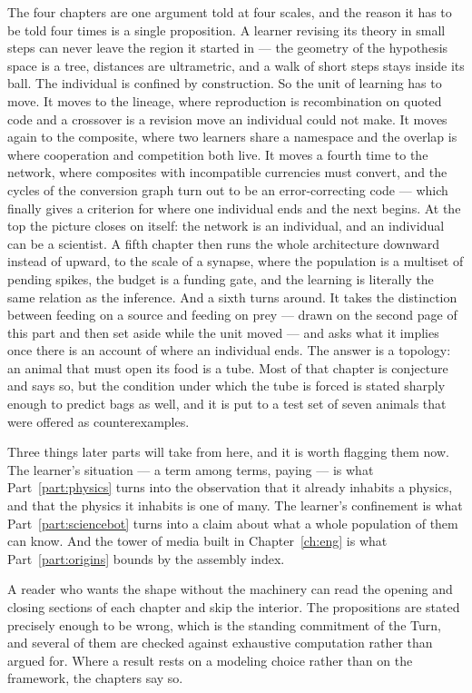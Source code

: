 \documentclass[12pt,openright,twoside]{book}
\theoremstyle{remark}
\theoremstyle{plain}
\theoremstyle{remark}
\theoremstyle{plain}
\theoremstyle{plain}
\begin{document}
The four chapters are one argument told at four scales, and the reason it
has to be told four times is a single proposition.
A learner revising its theory in small steps can never leave the region it
started in --- the geometry of the hypothesis space is a tree, distances are
ultrametric, and a walk of short steps stays inside its ball.
The individual is confined by construction.
So the unit of learning has to move.
It moves to the lineage, where reproduction is recombination on quoted code
and a crossover is a revision move an individual could not make.
It moves again to the composite, where two learners share a namespace and
the overlap is where cooperation and competition both live.
It moves a fourth time to the network, where composites with incompatible
currencies must convert, and the cycles of the conversion graph turn out to
be an error-correcting code --- which finally gives a criterion for where one
individual ends and the next begins.
At the top the picture closes on itself: the network is an individual, and
an individual can be a scientist.
A fifth chapter then runs the whole architecture downward instead of
upward, to the scale of a synapse, where the population is a multiset of
pending spikes, the budget is a funding gate, and the learning is
literally the same relation as the inference.
And a sixth turns around. It takes the distinction between feeding on a
source and feeding on prey --- drawn on the second page of this part and
then set aside while the unit moved --- and asks what it implies once
there is an account of where an individual ends. The answer is a
topology: an animal that must open its food is a tube. Most of that
chapter is conjecture and says so, but the condition under which the
tube is forced is stated sharply enough to predict bags as well, and
it is put to a test set of seven animals that were offered as
counterexamples.

Three things later parts will take from here, and it is worth flagging
them now.
The learner's situation --- a term among terms, paying --- is what
Part~\ref{part:physics} turns into the observation that it already
inhabits a physics, and that the physics it inhabits is one of many.
The learner's confinement is what Part~\ref{part:sciencebot} turns into a
claim about what a whole population of them can know.
And the tower of media built in Chapter~\ref{ch:eng} is what
Part~\ref{part:origins} bounds by the assembly index.

A reader who wants the shape without the machinery can read the opening and
closing sections of each chapter and skip the interior.
The propositions are stated precisely enough to be wrong, which is the
standing commitment of the Turn, and several of them are checked against
exhaustive computation rather than argued for.
Where a result rests on a modeling choice rather than on the framework, the
chapters say so.
\end{document}
